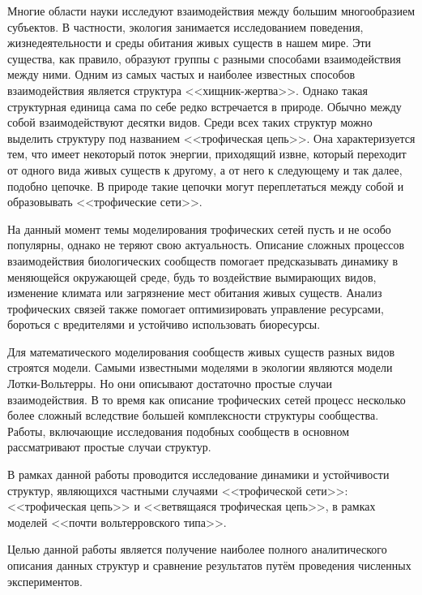 Многие области науки исследуют взаимодействия между большим многообразием субъектов. В частности, экология занимается исследованием поведения, жизнедеятельности и среды обитания живых существ в нашем мире. Эти существа, как правило, образуют группы с разными способами взаимодействия между ними. Одним из самых частых и наиболее известных способов взаимодействия является структура <<хищник-жертва>>. Однако такая структурная единица сама по себе редко встречается в природе. Обычно между собой взаимодействуют десятки видов. Среди всех таких структур можно выделить структуру под названием <<трофическая цепь>>. Она характеризуется тем, что имеет некоторый поток энергии, приходящий извне, который переходит от одного вида живых существ к другому, а от него к следующему и так далее, подобно цепочке. В природе такие цепочки могут переплетаться между собой и образовывать <<трофические сети>>.

На данный момент темы моделирования трофических сетей пусть и не особо популярны, однако не теряют свою актуальность. Описание сложных процессов взаимодействия биологических сообществ помогает предсказывать динамику в меняющейся окружающей среде, будь то воздействие вымирающих видов, изменение климата или загрязнение мест обитания живых существ. Анализ трофических связей также помогает оптимизировать
управление ресурсами, бороться с вредителями и устойчиво использовать биоресурсы.

Для математического моделирования сообществ живых существ разных видов строятся модели. Самыми известными моделями в экологии являются модели Лотки-Вольтерры. Но они описывают достаточно простые случаи взаимодействия. В то время как описание трофических сетей процесс несколько более сложный вследствие большей комплексности структуры сообщества. Работы, включающие исследования подобных сообществ в основном рассматривают простые случаи структур.

В рамках данной работы проводится исследование динамики и устойчивости структур, являющихся частными случаями <<трофической сети>>: <<трофическая цепь>> и <<ветвящаяся трофическая цепь>>, в рамках моделей <<почти вольтерровского типа>>.

Целью данной работы является получение наиболее полного аналитического описания данных структур и сравнение результатов путём проведения численных экспериментов.
